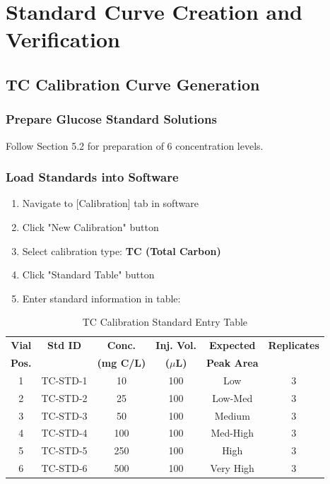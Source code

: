 \documentclass[11pt,a4paper]{article}\usepackage[]{graphicx}\usepackage[]{xcolor}
\begin{document}
\section{Standard Curve Creation and Verification}

\subsection{TC Calibration Curve Generation}

\subsubsection{Prepare Glucose Standard Solutions}
Follow Section 5.2 for preparation of 6 concentration levels.

\subsubsection{Load Standards into Software}
\begin{enumerate}[noitemsep]
    \item Navigate to [Calibration] tab in software
    \item Click "New Calibration" button
    \item Select calibration type: \textbf{TC (Total Carbon)}
    \item Click "Standard Table" button
    \item Enter standard information in table:
\end{enumerate}

\begin{table}[h]
\centering
\small
\begin{tabular}{cccccc}
\toprule
\textbf{Vial} & \textbf{Std ID} & \textbf{Conc.} & \textbf{Inj. Vol.} & \textbf{Expected} & \textbf{Replicates} \\
\textbf{Pos.} & & \textbf{(mg C/L)} & \textbf{($\mu$L)} & \textbf{Peak Area} & \\
\midrule
1 & TC-STD-1 & 10 & 100 & Low & 3 \\
2 & TC-STD-2 & 25 & 100 & Low-Med & 3 \\
3 & TC-STD-3 & 50 & 100 & Medium & 3 \\
4 & TC-STD-4 & 100 & 100 & Med-High & 3 \\
5 & TC-STD-5 & 250 & 100 & High & 3 \\
6 & TC-STD-6 & 500 & 100 & Very High & 3 \\
\bottomrule
\end{tabular}
\caption{TC Calibration Standard Entry Table}
\end{table}
\end{document}
